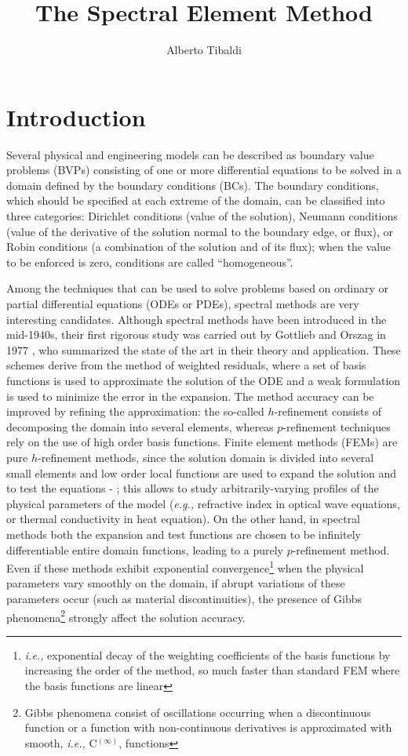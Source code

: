 \documentclass[a4paper,12pt]{article}
\author{Alberto Tibaldi}
\title{The Spectral Element Method}
\begin{document}
\maketitle

\section{Introduction}

Several physical and engineering models can be described as boundary value problems (BVPs) consisting of one or more differential equations to be solved in a domain defined by the boundary conditions (BCs). The boundary conditions, which should be specified at each extreme of the domain, can be classified into three categories: Dirichlet conditions (value of the solution), Neumann conditions (value of the derivative of the solution normal to the boundary edge, or flux), or Robin conditions (a combination of the solution and of its flux); when the value to be enforced is zero, conditions are called ``homogeneous''.

Among the techniques that can be used to solve problems based on ordinary or partial differential equations (ODEs or PDEs), spectral methods are very interesting candidates. Although spectral methods have been introduced in the mid-1940s, their first rigorous study was carried out by Gottlieb and Orszag in 1977 \cite{gottlieb}, who summarized the state of the art in their theory and application. These schemes derive from the method of weighted residuals, where a set of basis functions is used to approximate the solution of the ODE and a weak formulation is used to minimize the error in the expansion. The method accuracy can be improved by refining the approximation: the so-called $h$-refinement consists of decomposing the domain into several elements, whereas $p$-refinement techniques rely on the use of high order basis functions. Finite element methods (FEMs) are pure $h$-refinement methods, since the solution domain is divided into several small elements and low order local functions are used to expand the solution and to test the equations \cite{silvester} - \cite{vichnevetsky}; this allows to study arbitrarily-varying profiles of the physical parameters of the model (\textit{e.g.,} refractive index in optical wave equations, or thermal conductivity in heat equation). On the other hand, in spectral methods both the expansion and test functions are chosen to be infinitely differentiable entire domain functions, leading to a purely $p$-refinement method. Even if these methods exhibit exponential convergence\footnote{\textit{i.e.,} exponential decay of the weighting coefficients of the basis functions by increasing the order of the method, so much faster than standard FEM where the basis functions are linear} when the physical parameters vary smoothly on the domain, if abrupt variations of these parameters occur (such as material discontinuities), the presence of Gibbs phenomena\footnote{Gibbs phenomena consist of oscillations occurring when a discontinuous function or a function with non-continuous derivatives is approximated with smooth, \textit{i.e.,} C$^{(\infty)}$, functions} strongly affect the solution accuracy.
\end{document}
